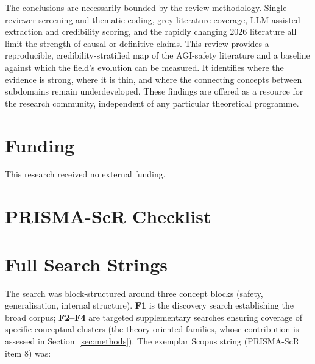 The conclusions are necessarily bounded by the review methodology. Single-reviewer screening and thematic coding, grey-literature coverage, LLM-assisted extraction and credibility scoring, and the rapidly changing 2026 literature all limit the strength of causal or definitive claims. This review provides a reproducible, credibility-stratified map of the AGI-safety literature and a baseline against which the field's evolution can be measured. It identifies where the evidence is strong, where it is thin, and where the connecting concepts between subdomains remain underdeveloped. These findings are offered as a resource for the research community, independent of any particular theoretical programme.

\section*{Funding}
\noindent This research received no external funding.




\appendix

\section{PRISMA-ScR Checklist}\label{app:prisma-scr}



\section{Full Search Strings}\label{app:search-strings}

The search was block-structured around three concept blocks (safety, generalisation, internal structure). \textbf{F1} is the discovery search establishing the broad corpus; \textbf{F2--F4} are targeted supplementary searches ensuring coverage of specific conceptual clusters (the theory-oriented families, whose contribution is assessed in Section~\ref{sec:methods}). The exemplar Scopus string (PRISMA-ScR item 8) was:

